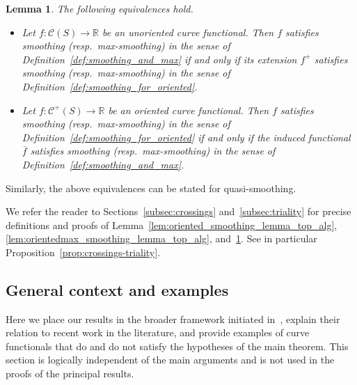 \documentclass[11pt]{amsart}
\numberwithin{equation}{section}
\numberwithin{figure}{section}
\newtheorem{lemma}[theorem]{Lemma}
\theoremstyle{definition}
\theoremstyle{plain}
\newcommand{\Curves}{\mathcal{C}}
\begin{document}
\begin{lemma}
The following equivalences hold.
\begin{itemize}

\item Let $f \colon \Curves(S) \to \mathbb{R}$ be an unoriented curve functional.
Then $f$ satisfies smoothing (resp.\ max-smoothing) in the sense of
Definition~\ref{def:smoothing_and_max} if and only if its extension
$f^+$ satisfies smoothing (resp.\ max-smoothing) in the sense of
Definition~\ref{def:smoothing_for_oriented}.

\item Let $f \colon \Curves^+(S)\to \mathbb{R}$ be an
oriented curve functional.
Then $f$ satisfies smoothing (resp.\ max-smoothing) in the sense of
Definition~\ref{def:smoothing_for_oriented} if and only if the induced
functional $\overline{f}$ satisfies smoothing (resp.\ max-smoothing)
in the sense of Definition~\ref{def:smoothing_and_max}.

\end{itemize}
\label{lem:smoothing_lemma_top_alg}
\end{lemma}

Similarly, the above equivalences can be stated for quasi-smoothing.

We refer the reader to Sections~\ref{subsec:crossings}
and~\ref{subsec:triality} for precise
definitions and proofs of
Lemma~\ref{lem:oriented_smoothing_lemma_top_alg},
\ref{lem:orientedmax_smoothing_lemma_top_alg},
and~\ref{lem:smoothing_lemma_top_alg}. See in particular
Proposition~\ref{prop:crossings-triality}.

\subsection{General context and examples}

Here we place our results in the broader framework initiated
in~\cite{MGT21:Smoothings}, explain their relation to recent work in
the literature, and provide examples of curve functionals that do and
do not satisfy the hypotheses of the main theorem.
This section is logically independent of the main arguments and is not
used in the proofs of the principal results.
\end{document}
